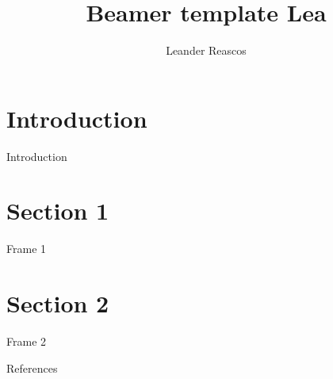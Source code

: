 \documentclass[aspectratio=169]{beamer}
\title{Beamer template Lea}
\author{Leander Reascos}
\begin{document}
    \begin{frame}[plain]
        \titlepage
    \end{frame}

    \begin{frame}{\contentsname}
        \tableofcontents[hideallsubsections]
    \end{frame}

    \section{Introduction}
    \begin{frame}{Introduction}
        
    \end{frame}


    \section{Section 1}
    \begin{frame}{Frame 1}
        
    \end{frame}

    \section{Section 2}
    \begin{frame}{Frame 2}
        
    \end{frame}


    \begin{frame}{References}
        \nocite{*}
        \printbibliography
    \end{frame}
\end{document}
